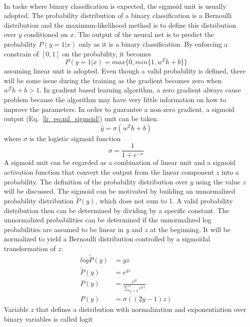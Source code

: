 \paragraph{}
In tasks where binary classification is expected, the sigmoid unit is usually adopted.
The probability distribution of a binary classification is a Bernoulli distribution and the maximum-likelihood method is to define this distribution over $y$ conditioned on $x$.
The output of the neural net is to predict the probability $P(y=1|x)$ only as it is a binary classification.
By enforcing a constrain of $[0,1]$ on the probability, it becomes
\begin{equation}
    P(y=1|x) = max\{0,min\{1, w^T h + b\}\}
\end{equation}
%
assuming linear unit is adopted.
Even though a valid probability is defined, there will be some issue during the training as the gradient becomes zero when $w^T h +b>1$.
In gradient based learning algorithm, a zero gradient always cause problem because the algorithm may have very little information on how to improve the parameters.
In order to guarantee a non-zero gradient, a sigmoid output (Eq.~\ref{lr_eq:ml_sigmoid}) unit can be taken.
\begin{equation}
    \hat{y} = \sigma (w^T h +b)
    \label{lr_eq:ml_sigmoid}
\end{equation}
where $\sigma$ is the logistic sigmoid function
\begin{equation}
    \sigma = \frac{1}{1+e^{-x}}
\end{equation}
%
A sigmoid unit can be regarded as a combination of linear unit and a sigmoid activation function that convert the output from the linear component $z$ into a probability.
The definition of the probability distribution over $y$ using the value $z$ will be discussed.
The sigmoid can be motivated by building an unnormalized probability distribution $\tilde{P}(y)$, which does not sum to 1.
A valid probability distribution then can be determined by dividing by a specific constant.
The unnormalized probabilities can be determined if the unnormalized log probabilities are assumed to be linear in $y$ and $z$ at the beginning.
It will be normalized to yield a Bernoulli distribution controlled by a sigmoidal transformation of $z$:
\begin{equation}
    \begin{aligned}
        log \tilde{P} (y) &= yz \\
        \tilde{P} (y) &= e^{yz} \\
        P(y) &= \frac{e^{yz}}{\sum_{y^\prime=0}^1 e^{y^\prime z}} \\
        P(y) &= \sigma ((2y-1)z)
    \end{aligned}
\end{equation}
%
Variable $z$ that defines a distribution with normalization and exponentiation over binary variables is called logit

